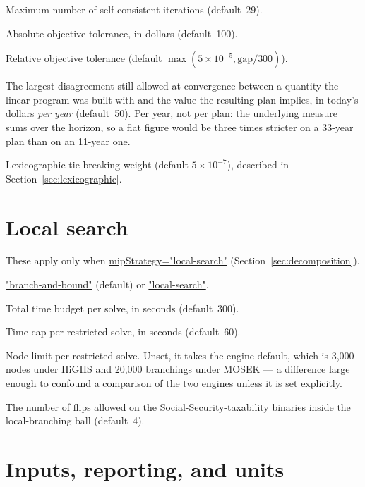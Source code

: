 \documentclass[fleqn,12pt]{report}
\newcommand{\code}[1]{\url{#1}}
\begin{document}
\begin{description}[style=nextline, leftmargin=1.5cm, font=\ttfamily]
\item[maxIter]
Maximum number of self-consistent iterations (default~29).
\item[absTol]
Absolute objective tolerance, in dollars (default~100).
\item[relTol]
Relative objective tolerance (default $\max(5\times10^{-5}, \textrm{gap}/300)$).
\item[residualTol]
The largest disagreement still allowed at convergence between a quantity the
linear program was built with and the value the resulting plan implies, in
today's dollars \emph{per year} (default~50).  Per year, not per plan: the
underlying measure sums over the horizon, so a flat figure would be three times
stricter on a 33-year plan than on an 11-year one.
\item[epsilon]
Lexicographic tie-breaking weight (default $5\times10^{-7}$), described in
Section~\ref{sec:lexicographic}.
\end{description}

\section{Local search}

These apply only when \code{mipStrategy="local-search"}
(Section~\ref{sec:decomposition}).

\begin{description}[style=nextline, leftmargin=1.5cm, font=\ttfamily]
\item[mipStrategy]
\code{"branch-and-bound"} (default) or \code{"local-search"}.
\item[localSearchTime]
Total time budget per solve, in seconds (default~300).
\item[localSearchStepTime]
Time cap per restricted solve, in seconds (default~60).
\item[localSearchStepNodes]
Node limit per restricted solve.  Unset, it takes the engine default, which is
3,000 nodes under HiGHS and 20,000 branchings under MOSEK --- a difference large
enough to confound a comparison of the two engines unless it is set explicitly.
\item[localSearchRadius]
The number of flips allowed on the Social-Security-taxability binaries inside the
local-branching ball (default~4).
\end{description}

\section{Inputs, reporting, and units}
\end{document}
